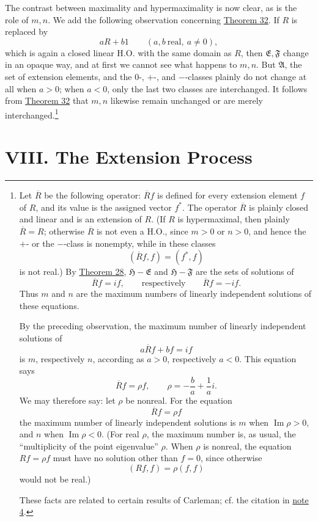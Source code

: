 ﻿\documentclass[paper=b5,fontsize=13pt,bookmarkpackage=false,twoside]{scrartcl}
\begin{document}
The contrast between maximality and hypermaximality is now clear, as is the role of $m,n$. We add the following observation concerning \hyperref[thm:32]{Theorem 32}. If $R$ is replaced by
\[
aR+b1
\qquad(a,b\ \text{real},\ a\ne0),
\]
which is again a closed linear H.O. with the same domain as $R$, then $\mathfrak E,\mathfrak F$ change in an opaque way, and at first we cannot see what happens to $m,n$. But $\mathfrak A$, the set of extension elements, and the $0$-, $+$-, and $-$-classes plainly do not change at all when $a>0$; when $a<0$, only the last two classes are interchanged. It follows from \hyperref[thm:32]{Theorem 32} that $m,n$ likewise remain unchanged or are merely interchanged.\footnote{\label{fn:46}Let $\overline R$ be the following operator: $\overline Rf$ is defined for every extension element $f$ of $R$, and its value is the assigned vector $f^*$. The operator $\overline R$ is plainly closed and linear and is an extension of $R$. (If $R$ is hypermaximal, then plainly $\overline R=R$; otherwise $\overline R$ is not even a H.O., since $m>0$ or $n>0$, and hence the $+$- or the $-$-class is nonempty, while in these classes
\[
(\overline Rf,f)=(f^*,f)
\]
is not real.) By \hyperref[thm:28]{Theorem 28}, $\mathfrak H-\mathfrak E$ and $\mathfrak H-\mathfrak F$ are the sets of solutions of
\[
\overline Rf=if,\qquad\text{respectively}\qquad \overline Rf=-if.
\]
Thus $m$ and $n$ are the maximum numbers of linearly independent solutions of these equations.

By the preceding observation, the maximum number of linearly independent solutions of
\[
a\overline Rf+bf=if
\]
is $m$, respectively $n$, according as $a>0$, respectively $a<0$. This equation says
\[
\overline Rf=\rho f,\qquad
\rho=-\frac ba+\frac1a i.
\]
We may therefore say: let $\rho$ be nonreal. For the equation
\[
\overline Rf=\rho f
\]
the maximum number of linearly independent solutions is $m$ when $\operatorname{Im}\rho>0$, and $n$ when $\operatorname{Im}\rho<0$. (For real $\rho$, the maximum number is, as usual, the ``multiplicity of the point eigenvalue'' $\rho$. When $\rho$ is nonreal, the equation $Rf=\rho f$ must have no solution other than $f=0$, since otherwise
\[
(Rf,f)=\rho(f,f)
\]
would not be real.)

These facts are related to certain results of Carleman; cf. the citation in \hyperref[fn:source-4]{note 4}.}

\section*{VIII. The Extension Process}\label{chap:VIII}
\end{document}
